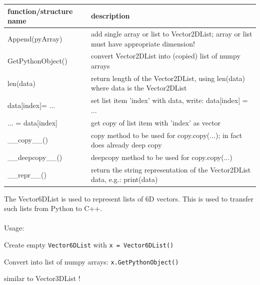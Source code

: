 \begin{center}
\footnotesize
\begin{longtable}{| p{8cm} | p{8cm} |} 
\hline
{\bf function/structure name} & {\bf description}\\ \hline
  Append(pyArray) & add single array or list to Vector2DList; array or list must have appropriate dimension!\\ \hline 
  GetPythonObject() & convert Vector2DList into (copied) list of numpy arrays\\ \hline 
  len(data) & return length of the Vector2DList, using len(data) where data is the Vector2DList\\ \hline 
  data[index]= ... & set list item 'index' with data, write: data[index] = ...\\ \hline 
  ... = data[index] & get copy of list item with 'index' as vector\\ \hline 
  \_\_copy\_\_() & copy method to be used for copy.copy(...); in fact does already deep copy\\ \hline 
  \_\_deepcopy\_\_() & deepcopy method to be used for copy.copy(...)\\ \hline 
  \_\_repr\_\_() & return the string representation of the Vector2DList data, e.g.: print(data)\\ \hline 
\end{longtable}
\end{center}

The Vector6DList is used to represent lists of 6D vectors. This is used to transfer such lists from Python to C++. \\ \\ Usage: \bi
  \item Create empty \texttt{Vector6DList} with \texttt{x = Vector6DList()} 
  \item Convert into list of numpy arrays: \texttt{x.GetPythonObject()}
  \item similar to Vector3DList !
\ei


